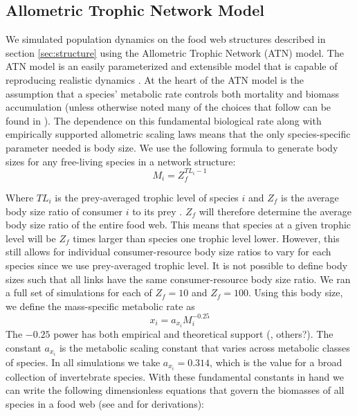 \documentclass[11pt]{amsart}
\begin{document}
\subsection{Allometric Trophic Network Model}

We simulated population dynamics on the food web structures described in section \ref{sec:structure} using the Allometric Trophic Network (ATN) model.  The ATN model is an easily parameterized and extensible model that is capable of reproducing realistic dynamics \cite{Boit2012}.  At the heart of the ATN model is the assumption that a species' metabolic rate controls both mortality and biomass accumulation (unless otherwise noted many of the choices that follow can be found in \cite{Brose2006}).  The dependence on this fundamental biological rate along with empirically supported allometric scaling laws means that the only species-specific parameter needed is body size.  We use the following formula to generate body sizes for any free-living species in a network structure:
\begin{equation}
M_i= Z_f^{TL_i-1}\label{eq:MFree}
\end{equation}

Where $TL_i$ is the prey-averaged trophic level of species $i$ and $Z_f$ is the average body size ratio of consumer $i$ to its prey \cite{Martinez2004}.  $Z_f$ will therefore determine the average body size ratio of the entire food web.  This means that species at a given trophic level will be $Z_f$ times larger than species one trophic level lower.  However, this still allows for individual consumer-resource body size ratios to vary for each species since we use prey-averaged trophic level.  It is not possible to define body sizes such that all links have the same consumer-resource body size ratio.  We ran a full set of simulations for each of $Z_f = 10$ and $Z_f = 100$.  Using this body size, we define the mass-specific metabolic rate as
\begin{equation}
x_i = a_{x_i} M_i^{-0.25}\label{eq:x}
\end{equation}
The $-0.25$ power has both empirical and theoretical support (\cite{Brown2004}, others?).  The constant $a_{x_i}$ is the metabolic scaling constant that varies across metabolic classes of species.  In all simulations we take $a_{x_i}=0.314$, which is the value for a broad collection of invertebrate species.  With these fundamental constants in hand we can write the following dimensionless equations that govern the biomasses of all species in a food web (see \cite{Yodzis1992} and \cite{Willams2007} for derivations): 
\end{document}
